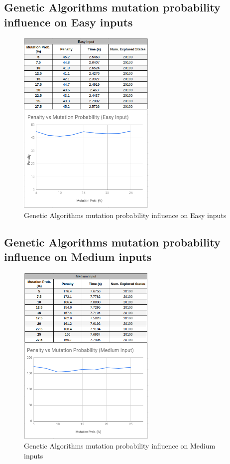 \documentclass[conference]{IEEEtran}
\begin{document}
\subsection{Genetic Algorithms mutation probability influence on Easy inputs}

\begin{figure}[H]
    \centerline{\includegraphics[width=250px]{mutation_prob_easy.png}}
    \caption{Genetic Algorithms mutation probability influence on Easy inputs}
\end{figure}

\subsection{Genetic Algorithms mutation probability influence on Medium inputs}

\begin{figure}[H]
    \centerline{\includegraphics[width=250px]{mutation_prob_medium.png}}
    \caption{Genetic Algorithms mutation probability influence on Medium inputs}
\end{figure}
\end{document}
